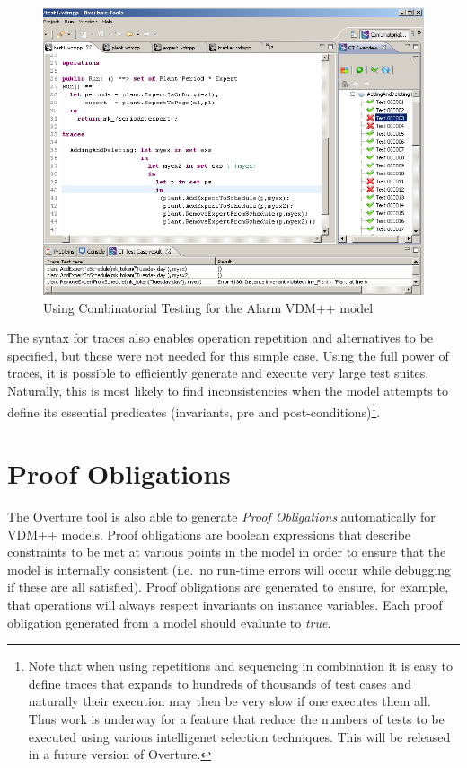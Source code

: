 \begin{figure}[htbp]
\begin{center}
\includegraphics[width=4.5in]{figures/tracesalarm}
\caption{Using Combinatorial Testing for the Alarm VDM++ model\label{fig:stracesalarm}}
\end{center}
\end{figure}

The syntax for traces also enables operation repetition and alternatives to be
specified, but these were not needed for this simple case. Using the full power
of traces, it is possible to efficiently generate and execute very large test
suites. Naturally, this is most likely to find inconsistencies when the model
attempts to define its essential predicates (invariants, pre and
post-conditions)\footnote{Note that when using repetitions and
  sequencing in combination it is easy to define traces that expands
  to hundreds of thousands of test cases and naturally their execution
  may then be very slow if one executes them all. Thus work is
  underway for a feature that reduce the numbers of tests to be
  executed using various intelligenet selection techniques. This will
  be released in a future version of Overture.}.

\section{Proof Obligations}\label{sec:PO}

The Overture tool is also able to generate \emph{Proof Obligations}
automatically for VDM++ models. Proof obligations are boolean
expressions that describe constraints to be met at various points in
the model in order to ensure that the model is internally consistent
(i.e.\ no run-time errors will occur while debugging if these are all
satisfied). Proof obligations are generated to ensure, for example,
that operations will always respect invariants on instance
variables. Each proof obligation generated from a model should
evaluate to \emph{true}.

